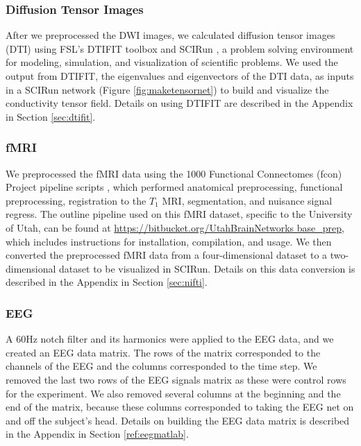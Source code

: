 \subsubsection{Diffusion Tensor Images}

After we preprocessed the DWI images, we calculated diffusion tensor images (DTI) using FSL's DTIFIT toolbox \cite{ref:dtifit} and SCIRun \cite{ref:scirun}, a problem solving environment for modeling, simulation, and visualization of scientific problems. We used the output from DTIFIT, the eigenvalues and eigenvectors of the DTI data, as inputs in a SCIRun network (Figure \ref{fig:maketensornet}) to build and visualize the conductivity tensor field. Details on using DTIFIT are described in the Appendix in Section \ref{sec:dtifit}.

\subsubsection{fMRI}
\label{sec:fmripre}

We preprocessed the fMRI data using the 1000 Functional Connectomes (fcon) Project pipeline scripts \cite{ref:fcon}, which performed anatomical preprocessing, functional preprocessing, registration to the $T_1$ MRI, segmentation, and nuisance signal regress. The outline pipeline used on this fMRI dataset, specific to the University of Utah, can be found at \url{https://bitbucket.org/UtahBrainNetworks base_prep}, which includes instructions for installation, compilation, and usage. We then converted the preprocessed fMRI data from a four-dimensional dataset to a two-dimensional dataset to be visualized in SCIRun. Details on this data conversion is described in the Appendix in Section \ref{sec:nifti}. 

\subsubsection{EEG}

A 60Hz notch filter and its harmonics \cite{ref:filter} were applied to the EEG data, and we created an EEG data matrix. The rows of the matrix corresponded to the channels of the EEG and the columns corresponded to the time step. We removed the last two rows of the EEG signals matrix as these were control rows for the experiment. We also removed several columns at the beginning and the end of the matrix, because these columns corresponded to taking the EEG net on and off the subject's head. Details on building the EEG data matrix is described in the Appendix in Section \ref{ref:eegmatlab}. 


